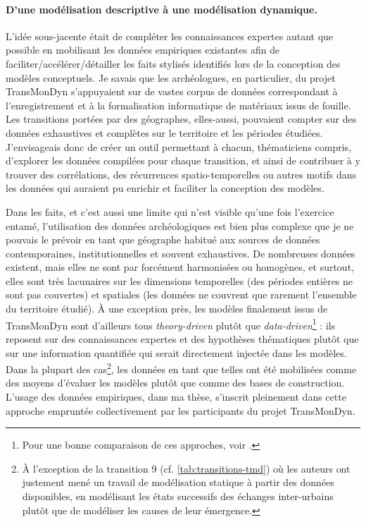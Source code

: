 \paragraph{D'une modélisation descriptive à une modélisation dynamique.}

L'idée sous-jacente était de compléter les connaissances expertes autant que possible en mobilisant les données empiriques existantes afin de faciliter/accélérer/détailler les faits stylisés identifiés lors de la conception des modèles conceptuels.
Je savais que les archéologues, en particulier, du projet TransMonDyn s'appuyaient sur de vastes corpus de données correspondant à l'enregistrement et à la formalisation informatique de matériaux issus de fouille.
Les transitions portées par des géographes, elles-aussi, pouvaient compter sur des données exhaustives et complètes sur le territoire et les périodes étudiées.
J'envisageais donc de créer un outil permettant à chacun, thématiciens compris, d'explorer les données compilées pour chaque transition, et ainsi de contribuer à y trouver des corrélations, des récurrences spatio-temporelles ou autres motifs dans les données qui auraient pu enrichir et faciliter la conception des modèles.

Dans les faits, et c'est aussi une limite qui n'est visible qu'une fois l'exercice entamé, l'utilisation des données archéologiques est bien plus complexe que je ne pouvais le prévoir en tant que géographe habitué aux sources de données contemporaines, institutionnelles et souvent exhaustives.
De nombreuses \og données\fg{} existent, mais elles ne sont par forcément harmonisées ou homogènes, et surtout, elles sont très lacunaires sur les dimensions temporelles (des périodes entières ne sont pas couvertes) et spatiales (les données ne couvrent que rarement l'ensemble du territoire étudié).
À une exception près, les modèles finalement issus de TransMonDyn sont d'ailleurs tous \og \textit{theory-driven}\fg{} plutôt que \og \textit{data-driven}\fg{}\footnote{
	Pour une bonne comparaison de ces approches, voir \textcite[120--122]{mathian_objets_2014}.
} :
	ils reposent sur des connaissances expertes et des hypothèses thématiques plutôt que sur une information quantifiée qui serait directement injectée dans les modèles.
Dans la plupart des cas\footnote{
	À l'exception de la transition 9 (cf. \cref{tab:transitions-tmd}) où les auteurs \autocite{bretagnolle_transition_2017} ont justement mené un travail de modélisation \og statique\fg{} à partir des données disponibles, en modélisant les états successifs des échanges inter-urbains plutôt que de modéliser les causes de leur émergence. 
}, les données en tant que telles ont été mobilisées comme des moyens d'évaluer les modèles plutôt que comme des bases de construction.
L'usage des données empiriques, dans ma thèse, s'inscrit pleinement dans cette approche empruntée collectivement par les participants du projet TransMonDyn.

